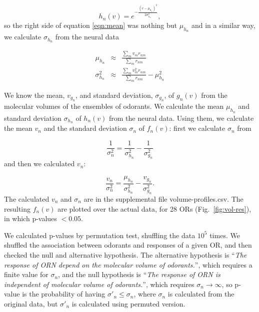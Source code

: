 \documentclass[fleqn,10pt]{wlscirep} %
\newcommand{\numberofreceptors}{ 28 }
\begin{document}
\begin{equation}
h_n(v) = e^{-\frac{(v-\mu_{h_n})^2}{2\sigma_{h_n}^2}}, 
\end{equation}
so the right side of equation \ref{eqn:mean} was nothing but $\mu_{h_n}$ and 
in a similar way, we calculate $\sigma_{h_n}$ from the neural data

\begin{eqnarray}
	\mu_{h_n} &\approx& \frac{\displaystyle \sum_{m} v_m r_{nm}}{\displaystyle \sum_{m} r_{nm}} \\
	\sigma_{h_n}^2 &\approx& \frac{\displaystyle \sum_{m} v_m^2 r_{nm}}{\displaystyle \sum_{m} r_{nm}} - \mu_{h_n}^2
	\label{eqn:final_h}
\end{eqnarray}


We know the mean, $v_{g_n}$, and standard deviation, $\sigma_{g_n}$, of $g_n(v)$ from the molecular volumes of the ensembles of odorants. 
We calculate the mean $\mu_{h_n}$ and standard deviation $\sigma_{h_n}$ of $h_n(v)$ from the neural data.
Using them, we calculate the mean $v_n$ and the standard deviation $\sigma_n$ of $f_n(v)$:
first we calculate $\sigma_n$ from 

\begin{equation}
	\frac{1}{\sigma_n^2} = \frac{1}{\sigma^2_{h_n}}  - \frac{1}{\sigma^2_{g_n}}
\end{equation}
and then we calculated $v_n$: 

\begin{equation}
	\frac{v_n}{\sigma_n^2}  =    \frac{\mu_{h_n}}{\sigma^2_{h_n}} - \frac{v_{g_n}}{\sigma^2_{g_n}}.
\end{equation}
The calculated $v_n$ and $\sigma_n$ are in the supplemental file volume-profiles.csv. 
The resulting $f_n(v)$ are plotted over the actual data, for \numberofreceptors ORs (Fig.~\ref{fig:vol-res}),
in which p-values $<0.05$. 

We calculated p-values by permutation test, shuffling the data $10^5$ times. 
We shuffled the association between odorants and responses of a given OR,  
and then checked the null and alternative hypothesis. 
The alternative hypothesis is
``{\it The response of ORN depend on the molecular volume of odorants.}'', 
which requires  a finite value for $\sigma_n$, 
and the null hypothesis is 
``{\it The response of ORN is independent of molecular volume of odorants.}'',
which requires $\sigma_n \rightarrow \infty$, 
so p-value is the probability of having $\sigma'_n\leq\sigma_n$, 
where $\sigma_n$ is calculated from the original data, but $\sigma'_n$ is calculated using permuted version. 
\end{document}
